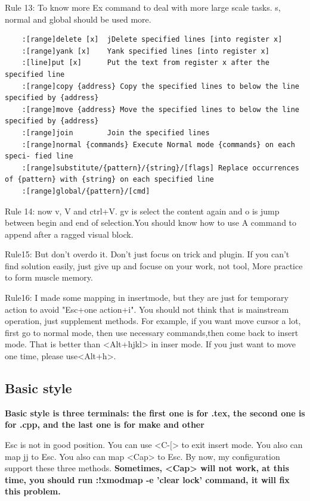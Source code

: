 \documentclass[paper=8.5in:11in, twoside, 12pt, pagesize=pdftex]{book}
\begin{document}
Rule 13: To know more Ex command to deal with more large scale tasks. s, normal and global should be used more. 

\begin{verbatim}
	:[range]delete [x]  jDelete specified lines [into register x]
	:[range]yank [x]    Yank specified lines [into register x]
	:[line]put [x]      Put the text from register x after the specified line
	:[range]copy {address} Copy the specified lines to below the line specified by {address}
	:[range]move {address} Move the specified lines to below the line specified by {address}
	:[range]join        Join the specified lines
	:[range]normal {commands} Execute Normal mode {commands} on each speci- fied line
	:[range]substitute/{pattern}/{string}/[flags] Replace occurrences of {pattern} with {string} on each specified line 
	:[range]global/{pattern}/[cmd]
\end{verbatim}

Rule 14: now v, V and ctrl+V. gv is select the content again and o is jump between begin and end of selection.You should know how to use A command to append after a ragged visual block.


Rule15: But don't overdo it. Don't just focus on trick and plugin. If you can't find solution easily, just give up and focuse on your work, not tool, More practice to form muscle memory.

Rule16: I made some mapping in insertmode, but they are just for temporary action to avoid "Esc+one action+i". You should not think that is mainstream operation, just supplement methods. For example, if you want move cursor a lot, first go to normal mode, then use necessary commands,then come back to insert mode. That is better than <Alt+hjkl> in inser mode. If you just want to move one time, please use<Alt+h>.


\subsection{Basic style}

\textbf{Basic style is three terminals: the first one is for .tex, the second one is for .cpp, and the last one is for make and other}

Esc is not in good position. You can use <C-$[$> to exit insert mode. You also can map jj to Esc. You also can map <Cap> to Esc. By now, my configuration support these three methods. \textbf{Sometimes, <Cap> will not work, at this time, you should run :!xmodmap -e 'clear lock' command, it will fix this problem.}
\end{document}
